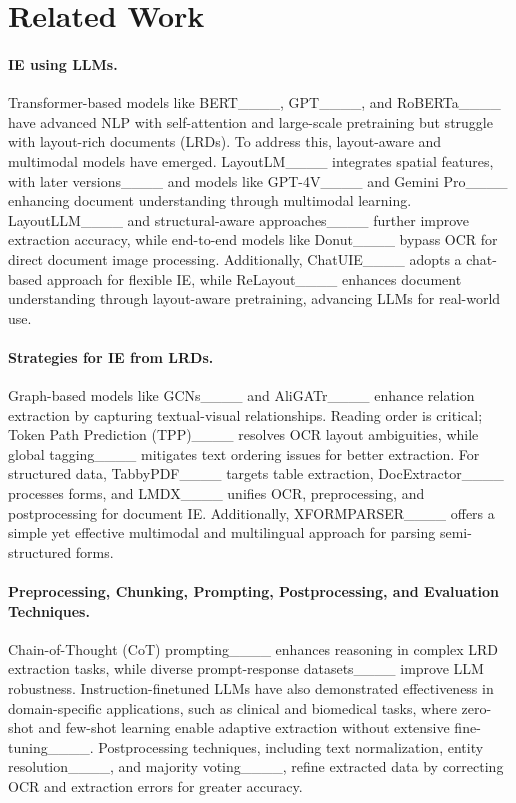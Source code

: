 \section{Related Work}
\label{sec:related_work}

\paragraph{IE using LLMs.} Transformer-based models like BERT____, GPT____, and RoBERTa____ have advanced NLP with self-attention and large-scale pretraining but struggle with layout-rich documents (LRDs). To address this, layout-aware and multimodal models have emerged. LayoutLM____ integrates spatial features, with later versions____ and models like GPT-4V____ and Gemini Pro____ enhancing document understanding through multimodal learning. LayoutLLM____ and structural-aware approaches____ further improve extraction accuracy, while end-to-end models like Donut____ bypass OCR for direct document image processing. Additionally, ChatUIE____ adopts a chat-based approach for flexible IE, while ReLayout____ enhances document understanding through layout-aware pretraining, advancing LLMs for real-world use.

\paragraph{Strategies for IE from LRDs.} Graph-based models like GCNs____ and AliGATr____ enhance relation extraction by capturing textual-visual relationships. Reading order is critical; Token Path Prediction (TPP)____ resolves OCR layout ambiguities, while global tagging____ mitigates text ordering issues for better extraction. For structured data, TabbyPDF____ targets table extraction, DocExtractor____ processes forms, and LMDX____ unifies OCR, preprocessing, and postprocessing for document IE. Additionally, XFORMPARSER____ offers a simple yet effective multimodal and multilingual approach for parsing semi-structured forms.

\paragraph{Preprocessing, Chunking, Prompting, Postprocessing, and Evaluation Techniques.} Chain-of-Thought (CoT) prompting____ enhances reasoning in complex LRD extraction tasks, while diverse prompt-response datasets____ improve LLM robustness. Instruction-finetuned LLMs have also demonstrated effectiveness in domain-specific applications, such as clinical and biomedical tasks, where zero-shot and few-shot learning enable adaptive extraction without extensive fine-tuning____. Postprocessing techniques, including text normalization, entity resolution____, and majority voting____, refine extracted data by correcting OCR and extraction errors for greater accuracy.

